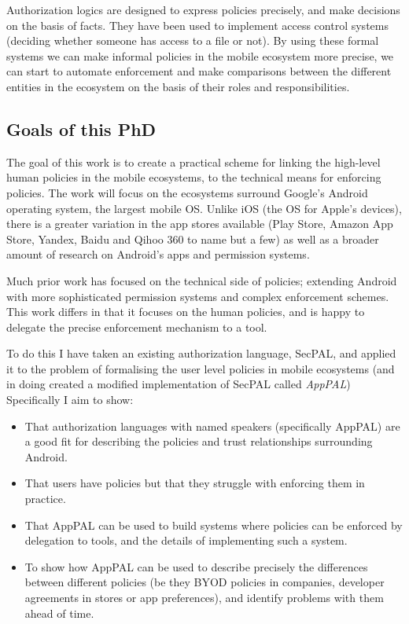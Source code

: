 \documentclass[a4paper]{scrartcl}
\begin{document}
Authorization logics are designed to express policies precisely, and make
decisions on the basis of facts. They have been used to implement access control
systems (deciding whether someone has access to a file or not).  By using these
formal systems we can make informal policies in the mobile ecosystem
more precise, we can start to automate enforcement and make comparisons between
the different entities in the ecosystem on the basis of their roles and
responsibilities.

\subsection{Goals of this PhD}

The goal of this work is to create a practical scheme for linking the high-level
human policies in the mobile ecosystems, to the technical means for enforcing
policies.
The work will focus on the ecosystems surround Google's Android operating system, the
largest mobile OS.  Unlike iOS (the OS for Apple's devices), there is a greater
variation in the app stores available (Play Store, Amazon App Store, Yandex,
Baidu and Qihoo 360 to name but a few) as well as a broader amount of research
on Android's apps and permission systems.


Much prior work has focused on the
technical side of policies; extending Android with more sophisticated permission
systems and complex enforcement schemes.  This work differs in that it focuses
on the human policies, and is happy to delegate the precise enforcement
mechanism to a tool.

To do this I have taken an existing authorization language, SecPAL, and applied
it to the problem of formalising the user level policies in mobile ecosystems
(and in doing created a modified implementation of SecPAL called \emph{AppPAL})
Specifically I aim to show:

\begin{itemize}
\item That authorization languages with named speakers (specifically AppPAL) are
  a good fit for describing the policies and trust relationships surrounding
  Android.
\item That users have policies but that they struggle with enforcing them in
  practice.
\item That AppPAL can be used to build systems where policies can be
  enforced by delegation to tools, and the details of implementing such a system.
\item To show how AppPAL can be used to describe precisely the differences
  between different policies (be they BYOD policies in companies, developer
  agreements in stores or app preferences), and identify problems
  with them ahead of time.
\end{itemize}
\end{document}
